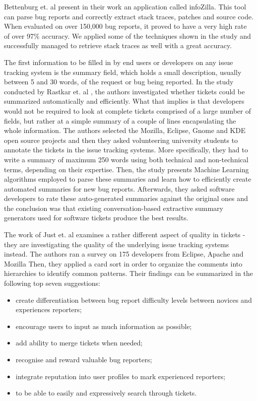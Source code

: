 \documentclass{mpaper}
\begin{document}
Bettenburg et. al \cite{bettenburg2012using} present in their work an application
called infoZilla. This tool can
parse bug reports and correctly extract stack traces, patches and source code. 
When evaluated on over 150,000 bug reports, it proved to have a very high rate of over 97\% accuracy.
We applied some of the techniques shown in the study and successfully managed to 
retrieve stack traces as well with a great accuracy.

The first information to be filled in by end users or developers on any issue tracking system
is the summary field, which holds a small description, usually between 5 and 30 words, of 
the request or bug being reported. In the study conducted by Rastkar et. al \cite{rastkar2010summarizing}, 
the authors investigated whether tickets could be summarized automatically and efficiently. What 
that implies is that developers would not be required to look at complete tickets comprised 
of a large number of fields, but rather at a simple summary of a couple of lines 
encapsulating the whole information. The authors selected the Mozilla, Eclipse, Gnome and KDE 
open source projects and then they asked volunteering university students to annotate 
the tickets in the issue tracking systems. More specifically, they had to write a summary 
of maximum 250 words using both technical and non-technical terms, depending on their expertise. 
Then, the study presents Machine Learning algorithms employed to parse these summaries and 
learn how to efficiently create automated summaries for new bug reports. Afterwards, they asked 
software developers to rate these auto-generated summaries against the original ones and 
the conclusion was that existing conversation-based extractive summary generators used 
for software tickets produce the best results.

The work of Just et. al \cite{just2008towards} examines a rather different aspect
of quality in tickets - they are investigating the quality of the underlying issue 
tracking systems instead. 
The authors ran a survey on 175 developers from Eclipse, Apache and Mozilla
Then, they applied a card sort in order to organize the comments into hierarchies to 
identify common patterns. Their findings can be summarized in the following top seven
suggestions:
  \begin{itemize}
    \item create differentiation between bug report difficulty levels between 
    novices and experiences reporters;
    \item encourage users to input as much information as possible;
    \item add ability to merge tickets when needed;
    \item recognise and reward valuable bug reporters;
    \item integrate reputation into user profiles to mark experienced reporters;
    \item to be able to easily and expressively search through tickets.
  \end{itemize}
\end{document}
